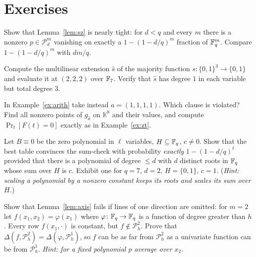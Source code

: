 \section*{Exercises}

\begin{exercise}[\stars{$\star\star$}]\label{ex:sz-tight}
Show that Lemma~\ref{lem:sz} is nearly tight: for $d<q$ and every $m$ there is a nonzero $p\in\mathcal P^m_d$ vanishing on exactly a $1-(1-d/q)^m$ fraction of $\mathbb{F}_q^m$.  Compare $1-(1-d/q)^m$ with $dm/q$.
\end{exercise}

\begin{exercise}[\stars{$\star$}]\label{ex:maj}
Compute the multilinear extension $\hat s$ of the majority function $s\colon\{0,1\}^3\to\{0,1\}$ and evaluate it at $(2,2,2)$ over $\mathbb{F}_7$.  Verify that $\hat s$ has degree $1$ in each variable but total degree $3$.
\end{exercise}

\begin{exercise}[\stars{$\star$}]\label{ex:arith2}
In Example~\ref{ex:arith} take instead $a=(1,1,1,1)$.  Which clause is violated?  Find all nonzero points of $g_{\hat a}$ on $\mathbb K^{8}$ and their values, and compute $\Pr_t[F(t)=0]$ exactly as in Example~\ref{ex:zt}.
\end{exercise}

\begin{exercise}[\stars{$\star\star$}]\label{ex:sc-tight}
Let $B\equiv0$ be the zero polynomial in $\ell$ variables, $H\subseteq\mathbb{F}_q$, $c\ne0$.  Show that the best table convinces the sum-check with probability \emph{exactly} $1-(1-d/q)^\ell$ provided that there is a polynomial
of degree $\le d$ with $d$ distinct roots in $\mathbb{F}_q$ whose sum over $H$ is $c$.  Exhibit one for $q=7$, $d=2$, $H=\{0,1\}$, $c=1$.  (\emph{Hint: scaling a polynomial by a nonzero constant keeps its roots and scales its sum over $H$.})
\end{exercise}

\begin{exercise}[\stars{$\star$}]\label{ex:onedir}
Show that Lemma~\ref{lem:axis} fails if lines of one direction are omitted: for $m=2$ let $f(x_1,x_2)=\varphi(x_1)$ where $\varphi\colon\mathbb{F}_q\to\mathbb{F}_q$ is a function of degree greater than $h$.  Every row $f(x_1,\cdot)$ is constant,
but $f\notin\mathcal P^2_h$.  Prove that $\Delta(f,\mathcal P^2_h)=\Delta(\varphi,\mathcal P^1_h)$, so $f$ can be as far from $\mathcal P^2_h$ as a univariate function can be from $\mathcal P^1_h$.
\emph{Hint: for a fixed polynomial $p$ average over $x_2$.}
\end{exercise}

